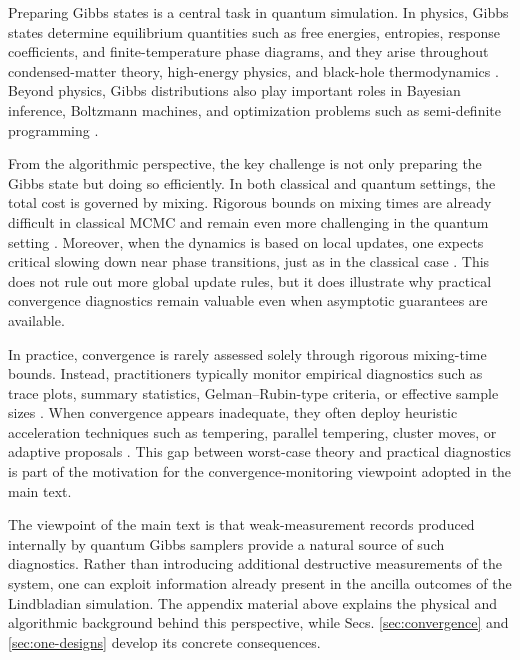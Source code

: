 \documentclass[showpacs,amsmath,amssymb,twocolumn,prx,superscriptaddress,10pt,aps,nofootinbib]{revtex4-2}
\begin{document}
Preparing Gibbs states is a central task in quantum simulation. In physics, Gibbs states determine equilibrium quantities such as free energies, entropies, response coefficients, and finite-temperature phase diagrams, and they arise throughout condensed-matter theory, high-energy physics, and black-hole thermodynamics \cite{Binder1987,landau2021guide,takahashi1996thermo,maldacena2003eternal,zhu2020generation}. Beyond physics, Gibbs distributions also play important roles in Bayesian inference, Boltzmann machines, and optimization problems such as semi-definite programming \cite{gelfand2000gibbs,ackley1985learning,amin2018quantum,arora2012multiplicative,brandao2017quantum,van2017quantum}.

From the algorithmic perspective, the key challenge is not only preparing the Gibbs state but doing so efficiently. In both classical and quantum settings, the total cost is governed by mixing. Rigorous bounds on mixing times are already difficult in classical MCMC and remain even more challenging in the quantum setting \cite{Temme2013,Kastoryano2013,Kastoryano2016,Capel2021,bardet2023rapid,ding2024polynomial,rouze2024optimal,rouze2025efficient,kochanowski2025rapid,tong2025fast,vsmid2025polynomial,vsmid2025rapid,bergamaschi2025quantum}. Moreover, when the dynamics is based on local updates, one expects critical slowing down near phase transitions, just as in the classical case \cite{wolff1989critical,sokal1991beat}. This does not rule out more global update rules, but it does illustrate why practical convergence diagnostics remain valuable even when asymptotic guarantees are available.

In practice, convergence is rarely assessed solely through rigorous mixing-time bounds. Instead, practitioners typically monitor empirical diagnostics such as trace plots, summary statistics, Gelman--Rubin-type criteria, or effective sample sizes \cite{Vivekananda2019,HandbookMCMC2011,Gelman1992,geyer1992practical,flegal2008markov}. When convergence appears inadequate, they often deploy heuristic acceleration techniques such as tempering, parallel tempering, cluster moves, or adaptive proposals \cite{MarinariParisi1992,swendsen1986replica,HukushimaNemoto1996,SwendsenWang1987,Wolff1989,HaarioSaksmanTamminen2001,AndrieuThoms2008}. This gap between worst-case theory and practical diagnostics is part of the motivation for the convergence-monitoring viewpoint adopted in the main text.

The viewpoint of the main text is that weak-measurement records produced internally by quantum Gibbs samplers provide a natural source of such diagnostics. Rather than introducing additional destructive measurements of the system, one can exploit information already present in the ancilla outcomes of the Lindbladian simulation. The appendix material above explains the physical and algorithmic background behind this perspective, while Secs. \ref{sec:convergence} and \ref{sec:one-designs} develop its concrete consequences.
\end{document}
